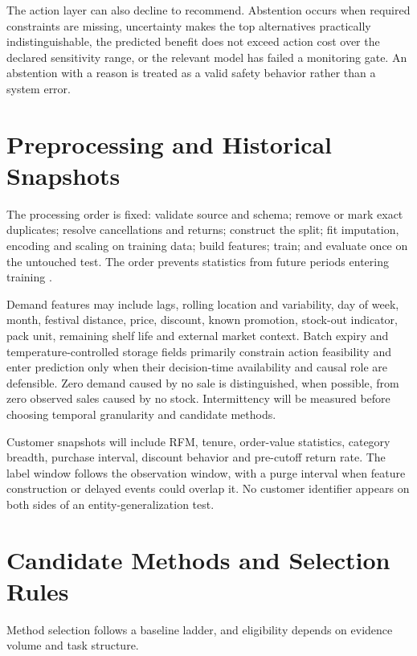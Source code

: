 The action layer can also decline to recommend. Abstention occurs when required
constraints are missing, uncertainty makes the top alternatives practically
indistinguishable, the predicted benefit does not exceed action cost over the
declared sensitivity range, or the relevant model has failed a monitoring gate.
An abstention with a reason is treated as a valid safety behavior rather than a
system error.

\section{Preprocessing and Historical Snapshots}

The processing order is fixed: validate source and schema; remove or mark exact
duplicates; resolve cancellations and returns; construct the split; fit
imputation, encoding and scaling on training data; build features; train; and
evaluate once on the untouched test. The order prevents statistics from future
periods entering training \cite{kaufman2012leakage}.

Demand features may include lags, rolling location and variability, day of week,
month, festival distance, price, discount, known promotion, stock-out indicator,
pack unit, remaining shelf life and external market context. Batch expiry and
temperature-controlled storage fields primarily constrain action feasibility and enter prediction
only when their decision-time availability and causal role are defensible. Zero demand caused by no sale is distinguished,
when possible, from zero observed sales caused by no stock. Intermittency will
be measured before choosing temporal granularity and candidate methods.

Customer snapshots will include RFM, tenure, order-value statistics, category
breadth, purchase interval, discount behavior and pre-cutoff return rate. The
label window follows the observation window, with a purge interval when feature
construction or delayed events could overlap it. No customer identifier appears
on both sides of an entity-generalization test.

\section{Candidate Methods and Selection Rules}

Method selection follows a baseline ladder, and eligibility depends on evidence
volume and task structure.


